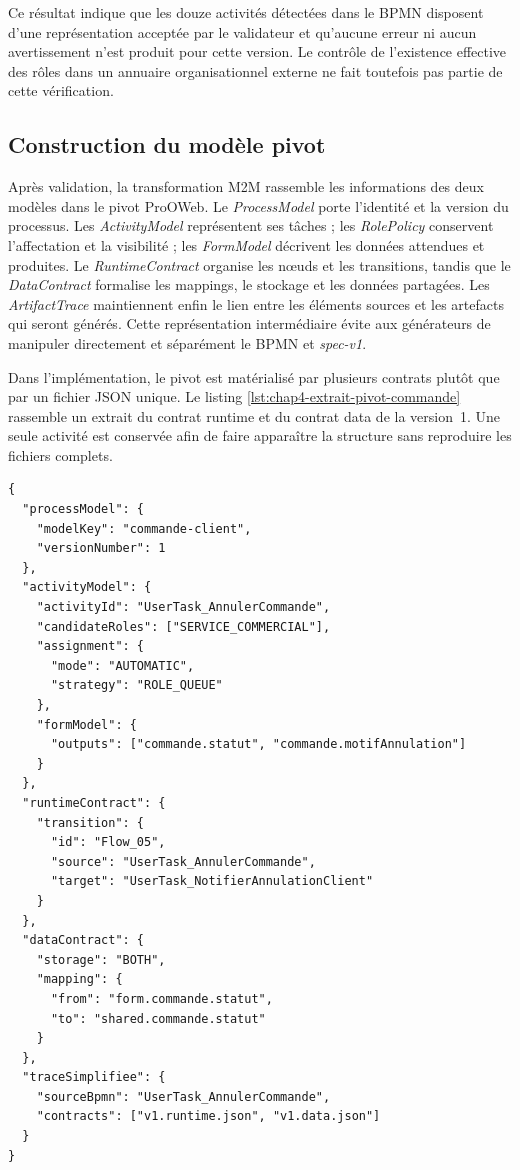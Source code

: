 Ce résultat indique que les douze activités détectées dans le BPMN disposent
d'une représentation acceptée par le validateur et qu'aucune erreur ni aucun
avertissement n'est produit pour cette version. Le contrôle de l'existence
effective des rôles dans un annuaire organisationnel externe ne fait toutefois
pas partie de cette vérification.

\subsection{Construction du modèle pivot}

Après validation, la transformation M2M rassemble les informations des deux
modèles dans le pivot ProOWeb. Le \textit{ProcessModel} porte l'identité et la
version du processus. Les \textit{ActivityModel} représentent ses tâches ; les
\textit{RolePolicy} conservent l'affectation et la visibilité ; les
\textit{FormModel} décrivent les données attendues et produites. Le
\textit{RuntimeContract} organise les nœuds et les transitions, tandis que le
\textit{DataContract} formalise les mappings, le stockage et les données
partagées. Les \textit{ArtifactTrace} maintiennent enfin le lien entre les
éléments sources et les artefacts qui seront générés. Cette représentation
intermédiaire évite aux générateurs de manipuler directement et séparément le
BPMN et \textit{spec-v1}.

Dans l'implémentation, le pivot est matérialisé par plusieurs contrats plutôt
que par un fichier JSON unique. Le listing
\ref{lst:chap4-extrait-pivot-commande} rassemble un extrait du contrat runtime
et du contrat data de la version~1. Une seule activité est conservée afin de
faire apparaître la structure sans reproduire les fichiers complets.

\begin{lstlisting}[breaklines=true,caption={Vue synthétique du modèle pivot de la commande client},label={lst:chap4-extrait-pivot-commande}]
{
  "processModel": {
    "modelKey": "commande-client",
    "versionNumber": 1
  },
  "activityModel": {
    "activityId": "UserTask_AnnulerCommande",
    "candidateRoles": ["SERVICE_COMMERCIAL"],
    "assignment": {
      "mode": "AUTOMATIC",
      "strategy": "ROLE_QUEUE"
    },
    "formModel": {
      "outputs": ["commande.statut", "commande.motifAnnulation"]
    }
  },
  "runtimeContract": {
    "transition": {
      "id": "Flow_05",
      "source": "UserTask_AnnulerCommande",
      "target": "UserTask_NotifierAnnulationClient"
    }
  },
  "dataContract": {
    "storage": "BOTH",
    "mapping": {
      "from": "form.commande.statut",
      "to": "shared.commande.statut"
    }
  },
  "traceSimplifiee": {
    "sourceBpmn": "UserTask_AnnulerCommande",
    "contracts": ["v1.runtime.json", "v1.data.json"]
  }
}
\end{lstlisting}

